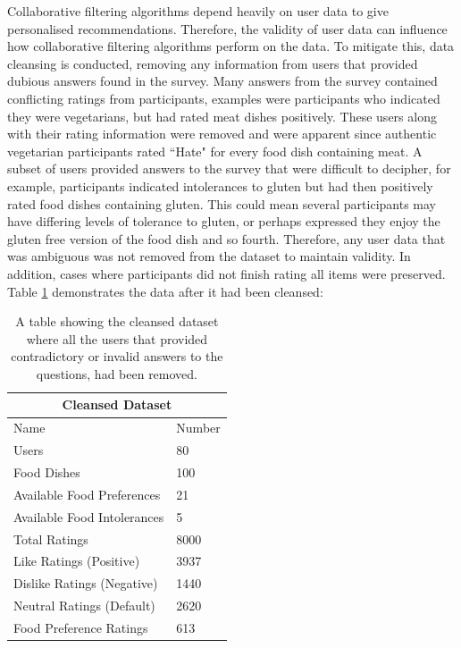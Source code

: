 Collaborative filtering algorithms depend heavily on user data to give personalised recommendations. Therefore, the validity of user data can influence how collaborative filtering algorithms perform on the data. To mitigate this, data cleansing is conducted, removing any information from users that provided dubious answers found in the survey. Many answers from the survey contained conflicting ratings from participants, examples were participants who indicated they were vegetarians, but had rated meat dishes positively. These users along with their rating information were removed and were apparent since authentic vegetarian participants rated ``Hate" for every food dish containing meat. A subset of users provided answers to the survey that were difficult to decipher, for example, participants indicated intolerances to gluten but had then positively rated food dishes containing gluten. This could mean several participants may have differing levels of tolerance to gluten, or perhaps expressed they enjoy the gluten free version of the food dish and so fourth. Therefore, any user data that was ambiguous was not removed from the dataset to maintain validity. In addition, cases where participants did not finish rating all items were preserved. Table \ref{table:cleansed_dataset} demonstrates the data after it had been cleansed:

\begin{table}[h!]
\centering
\begin{tabular}{|l|l|} 
 \hline
 \multicolumn{2}{|c|}{Cleansed Dataset} \\
     \hline\hline
     Name & Number\\ [0.5ex] 
     \hline
     Users & 80 \\
     \hline
     Food Dishes & 100 \\
     \hline
     Available Food Preferences & 21 \\ 
     \hline
     Available Food Intolerances & 5 \\ 
     \hline
     Total Ratings & 8000 \\
     \hline
     Like Ratings (Positive) & 3937 \\
     \hline
     Dislike Ratings (Negative) & 1440 \\ [1ex] 
     \hline
     Neutral Ratings (Default) & 2620 \\ [1ex] 
     \hline
     Food Preference Ratings & 613 \\ [1ex] 
     \hline
\end{tabular}
\caption{A table showing the cleansed dataset where all the users that provided contradictory or invalid answers to the questions, had been removed.}
\label{table:cleansed_dataset}
\end{table}

